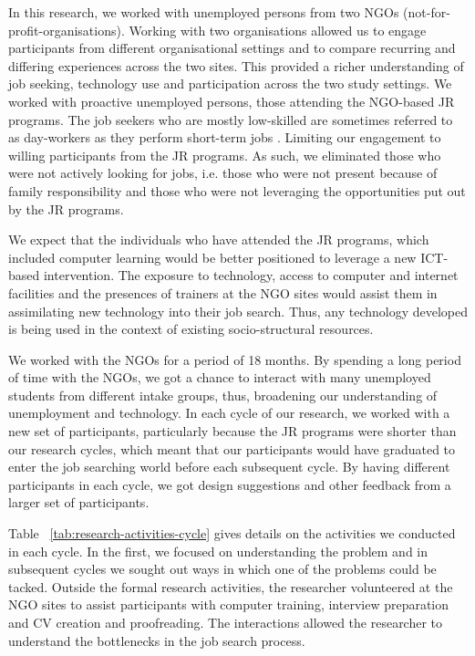 In this research, we worked with unemployed persons from two NGOs (not-for-profit-organisations). Working with two organisations allowed us to engage participants from different organisational settings and to compare recurring and differing experiences across the two sites. This provided a richer understanding of job seeking, technology use and participation across the two study settings. We worked with proactive unemployed persons, those attending the NGO-based JR programs. The job seekers who are mostly low-skilled are sometimes referred to as day-workers as they perform short-term jobs \cite{chepken2012tele, chepken2011}. Limiting our engagement to willing participants from the JR programs. As such, we eliminated those who were not actively looking for jobs, i.e. those who were not present because of family responsibility and those who were not leveraging the opportunities put out by the JR programs.

We expect that the individuals who have attended the JR programs, which included computer learning would be better positioned to leverage a new ICT-based intervention. The exposure to technology, access to computer and internet facilities and the presences of trainers at the NGO sites would assist them in assimilating new technology into their job search. Thus, any technology developed is being used in the context of existing socio-structural resources.

We worked with the NGOs for a period of 18 months. By spending a long period of time with the NGOs, we got a chance to interact with many unemployed students from different intake groups, thus, broadening our understanding of unemployment and technology. In each cycle of our research, we worked with a new set of participants, particularly because the JR programs were shorter than our research cycles, which meant that our participants would have graduated to enter the job searching world before each subsequent cycle. By having different participants in each cycle, we got design suggestions and other feedback from a larger set of participants.

Table ~\ref{tab:research-activities-cycle} gives details on the activities we conducted in each cycle. In the first, we focused on understanding the problem and in subsequent cycles we sought out ways in which one of the problems could be tacked. Outside the formal research activities, the researcher volunteered at the NGO sites to assist participants with computer training, interview preparation and CV creation and proofreading. The interactions allowed the researcher to understand the bottlenecks in the job search process.


